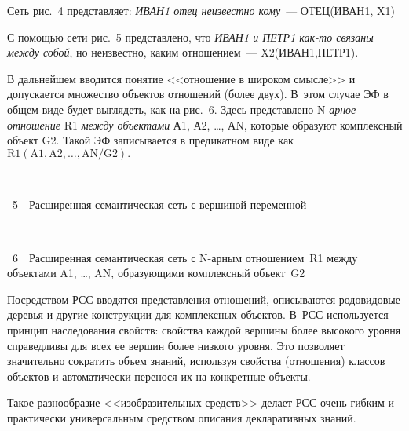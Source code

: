 \begin{multicols}{2}
 Сеть рис.~4 представляет: \textit{ИВАН1 отец неизвестно
кому}~--- ОТЕЦ(ИВАН1, X1)


 С помощью сети рис.~5 представлено, что \textit{ИВАН1 и
ПЕТР1 как-то связаны между собой}, но неизвестно, каким отношением~---
X2(ИВАН1,ПЕТР1).



 В дальнейшем вводится понятие <<отношение в широком смысле>> и
допускается множество объектов отношений (более двух). В~этом случае ЭФ в
общем виде будет выглядеть, как на рис.~6.
%
 Здесь представлено N-\textit{арное отношение} R1 \textit{между объектами}
А1, А2, \ldots, АN, которые образуют комплексный объект G2. Такой
ЭФ записывается в предикатном виде как
 $\mathrm{R1(A1,A2, \ldots ,AN/G2)}.
$

\noindent
\begin{center}
\mbox{%
\epsfxsize=46.06mm
}

\end{center}

\noindent
{{\figurename~5}\ \ \small{Расширенная семантическая сеть с вер\-ши\-ной-пе\-ре\-мен\-ной}}


\addtocounter{figure}{1}


\noindent
\begin{center}
\mbox{%
\epsfxsize=67.656mm
}

\end{center}

\noindent
{{\figurename~6}\ \ \small{Расширенная семантическая сеть с N-ар\-ным отношением~R1
между объектами A1, \ldots,
AN, образу\-ющи\-ми комплексный объект~G2}}


\addtocounter{figure}{1}

\vspace*{18pt}


 Посредством РСС вводятся представления отношений, описываются
родовидовые деревья и другие конструкции для комплексных
объектов. В~РСС используется принцип наследования свойств: свойства
каждой вершины более высокого уровня справедливы для всех ее вершин более
низкого уровня. Это позволяет значительно сократить объем знаний, используя
свойства (отношения) классов объектов и автоматически перенося их на
конкретные объекты.



 Такое разнообразие <<изобразительных средств>> делает РСС очень
гибким и практически универсальным средством описания декларативных
знаний.


\end{multicols}

